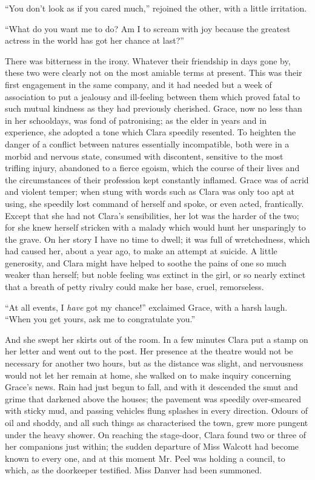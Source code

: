 ``You don't look as if you cared much,'' rejoined the other, with a
little irritation.

``What do you want me to do? Am I to scream with joy because the
greatest actress in the world has got her chance at last?''

There was bitterness in the irony. Whatever their friendship in days
gone by, these two were clearly not on the most amiable terms at
present. This was their first engagement in the same company, and it had
needed but a week of association to put a jealousy and ill-feeling
between them which proved fatal to such mutual kindness as they had
previously cherished. Grace, now no less than in her schooldays, was
fond of patronising; as the elder in years and in experience, she
adopted a tone which Clara speedily resented. To heighten the danger of
a conflict between natures essentially incompatible, both were in a
morbid and nervous state, consumed with discontent, sensitive to the
most trifling injury, abandoned to a fierce egoism, which
{\protect\hypertarget{201}{}{}}the course of their lives and the
circumstances of their profession kept constantly inflamed. Grace was of
acrid and violent temper; when stung with words such as Clara was only
too apt at using, she speedily lost command of herself and spoke, or
even acted, frantically. Except that she had not Clara's sensibilities,
her lot was the harder of the two; for she knew herself stricken with a
malady which would hunt her unsparingly to the grave. On her story I
have no time to dwell; it was full of wretchedness, which had caused
her, about a year ago, to make an attempt at suicide. A little
generosity, and Clara might have helped to soothe the pains of one so
much weaker than herself; but noble feeling was extinct in the girl, or
so nearly extinct that a breath of petty rivalry could make her base,
cruel, remorseless.

``At all events, I \emph{have} got my chance!'' exclaimed Grace, with a
harsh laugh. ``When you get yours, ask me to congratulate you.''

And she swept her skirts out of the room. In a few minutes Clara put a
stamp on her {\protect\hypertarget{202}{}{}}letter and went out to the
post. Her presence at the theatre would not be necessary for another two
hours, but as the distance was slight, and nervousness would not let her
remain at home, she walked on to make inquiry concerning Grace's news.
Rain had just begun to fall, and with it descended the smut and grime
that darkened above the houses; the pavement was speedily over-smeared
with sticky mud, and passing vehicles flung splashes in every direction.
Odours of oil and shoddy, and all such things as characterised the town,
grew more pungent under the heavy shower. On reaching the stage-door,
Clara found two or three of her companions just within; the sudden
departure of Miss Walcott had become known to every one, and at this
moment Mr. Peel was holding a council, to which, as the doorkeeper
testified. Miss Danver had been summoned.

